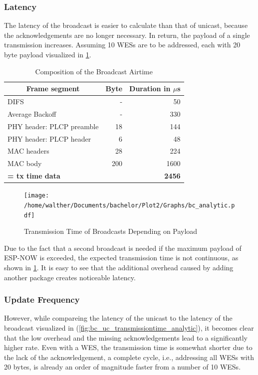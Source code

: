 \subsubsection*{Latency}

The latency of the broadcast is easier to calculate than that of unicast, 
because the acknowledgements are no longer necessary.
In return, the payload of a single transmission increases.
Assuming 10 WESs are to be addressed, each with 20 byte payload visualized in \ref{tab:airtime_broadcast_calc}.

\begin{table}[h]
	\centering
	\begin{tabular} { lrr }
		\toprule
		\multicolumn{1}{c}{Frame segment}
		& \multicolumn{1}{c}{Byte}
		& \multicolumn{1}{c}{Duration in $\mu$s} \\
		\midrule
		DIFS								& -		& 50 \\
		Average Backoff						& -		& 330 \\
		PHY header: PLCP preamble			& 18	& 144 \\
		PHY header: PLCP header				& 6 	& 48 \\
		MAC headers							& 28	& 224 \\
		MAC body							& 200 	& 1600 \\
		\textbf{= tx time data}				& 		& \textbf{2456} \\
		\bottomrule
	\end{tabular}
	\caption{Composition of the Broadcast Airtime}
	\label{tab:airtime_broadcast_calc}
\end{table}

\begin{figure}[h]
	\centering
	\texttt{[image: /home/walther/Documents/bachelor/Plot2/Graphs/bc\_analytic.pdf]}
	\caption{Transmission Time of Broadcasts Depending on Payload}
	\label{fig:bc_analytic}
\end{figure}

Due to the fact that a second broadcast is needed if the maximum payload of ESP-NOW is exceeded,
the expected transmission time is not continuous, as shown in \cref{fig:bc_analytic}.
It is easy to see that the additional overhead caused by adding another package creates noticeable latency.

\subsubsection*{Update Frequency}

However, while compareing the latency of the unicast to the latency of the broadcast visualized in (\ref{fig:bc_uc_transmissiontime_analytic}),
it becomes clear that the low overhead and the missing acknowledgements lead to a significantly higher rate.
Even with a WES, the transmission time is somewhat shorter due to the lack of the acknowledgement,
a complete cycle, i.e., addressing all WESs with 20 bytes,
is already an order of magnitude faster from a number of 10 WESs.

